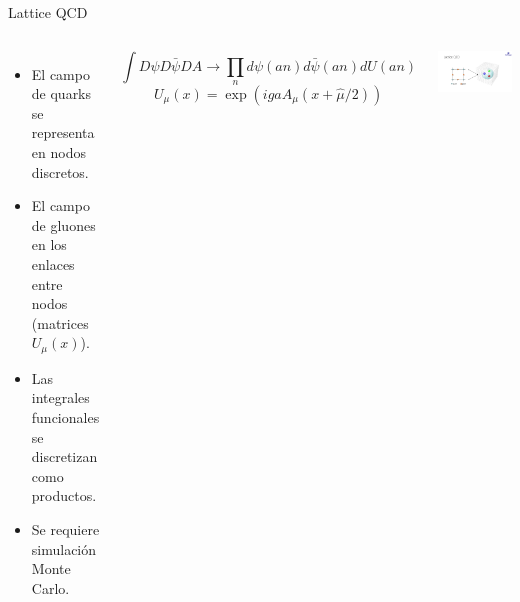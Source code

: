 \documentclass{beamer}
\begin{document}
\begin{frame}{Lattice QCD}
  \begin{columns}
    \begin{itemize}
      \item El campo de quarks se representa en nodos discretos.
      \item El campo de gluones en los enlaces entre nodos (matrices \( U_\mu(x) \)).
      \item Las integrales funcionales se discretizan como productos.
      \item Se requiere simulación Monte Carlo.
    \end{itemize}
    \vspace{1em}
    \begin{equation*}
      \int D\psi D\bar{\psi} DA \to \prod_{n} d\psi(an) d\bar{\psi}(an) dU(an)
    \end{equation*}
    \begin{equation*}
      U_\mu(x) = \exp(iga A_\mu(x + \hat{\mu}/2))
    \end{equation*}

    \centering
    \includegraphics[width=\linewidth]{figures/lattice_qcd.png}
  \end{columns}
\end{frame}

  
\end{document}
